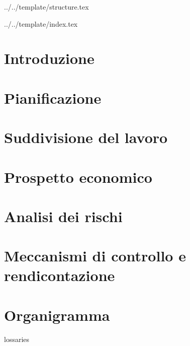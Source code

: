 

\def\DOCUMENTO{Piano di Progetto}
\def\VERSIONE{1.0.0}

\def\DESCRIZIONE{Documento che definisce la pianificazione delle attività del gruppo \GRUPPO{} nello svolgimento del progetto \PROGETTO.}

\def\REDATTORE {Agostinetto Matteo \\ & Burlin Valerio}
\def\VERIFICATORE {Ros Fabio}
\def\RESPONSABILE {Suierica Bogdan}

\def\USO {Esterno}

\def\DISTRIBUZIONE {\GRUPPO{}\\ & \COMMITTENTE{}\\}

\def\DESCRIZIONE {Documento che definisce la pianificazione delle attività del gruppo \GRUPPO{} nello svolgimento del progetto \PROGETTO.}


\def\INDICE	{true}
\def\TABELLE {true}
\def\FIGURE {true}


 {../../template/structure.tex}


 {../../template/index.tex}



%

\section{Introduzione}

\newpage
\section{Pianificazione}

\newpage
\section{Suddivisione del lavoro}

\newpage
\section{Prospetto economico}

\newpage
\section{Analisi dei rischi}

\newpage
\section{Meccanismi di controllo e rendicontazione}

\newpage
\appendix 
\section{Organigramma}

\newpage
lossaries


